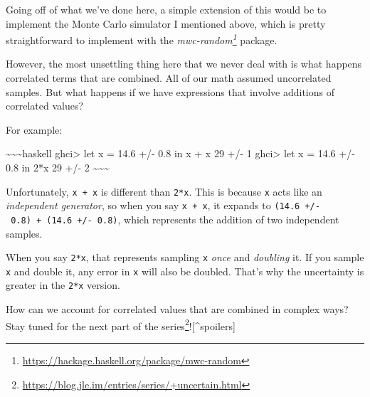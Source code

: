 \documentclass[]{article}
\renewcommand{\href}[2]{#2\footnote{\url{#1}}}
\begin{document}
Going off of what we've done here, a simple extension of this would be to
implement the Monte Carlo simulator I mentioned above, which is pretty
straightforward to implement with the
\emph{\href{https://hackage.haskell.org/package/mwc-random}{mwc-random}}
package.

However, the most unsettling thing here that we never deal with is what happens
correlated terms that are combined. All of our math assumed uncorrelated
samples. But what happens if we have expressions that involve additions of
correlated values?

For example:

\textasciitilde{}\textasciitilde{}\textasciitilde{}haskell ghci\textgreater{}
let x = 14.6 +/- 0.8 in x + x 29 +/- 1 ghci\textgreater{} let x = 14.6 +/- 0.8
in 2*x 29 +/- 2 \textasciitilde{}\textasciitilde{}\textasciitilde{}

Unfortunately, \texttt{x\ +\ x} is different than \texttt{2*x}. This is because
\texttt{x} acts like an \emph{independent generator}, so when you say
\texttt{x\ +\ x}, it expands to \texttt{(14.6\ +/-\ 0.8)\ +\ (14.6\ +/-\ 0.8)},
which represents the addition of two independent samples.

When you say \texttt{2*x}, that represents sampling \texttt{x} \emph{once} and
\emph{doubling} it. If you sample \texttt{x} and double it, any error in
\texttt{x} will also be doubled. That's why the uncertainty is greater in the
\texttt{2*x} version.

How can we account for correlated values that are combined in complex ways? Stay
tuned for the next part of the
\href{https://blog.jle.im/entries/series/+uncertain.html}{series}!{[}\^{}spoilers{]}
\end{document}
